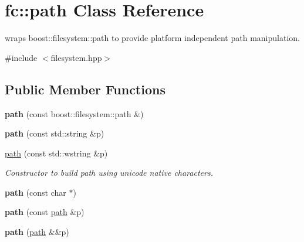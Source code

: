 \hypertarget{classfc_1_1path}{}\section{fc\+:\+:path Class Reference}
\label{classfc_1_1path}


wraps boost\+::filesystem\+::path to provide platform independent path manipulation.  




{\ttfamily \#include $<$filesystem.\+hpp$>$}

\subsection*{Public Member Functions}
\begin{DoxyCompactItemize}
\item 
\mbox{\label{classfc_1_1path_add8f88ad5dd493b16904860ce9be6493}} 
{\bfseries path} (const boost\+::filesystem\+::path \&)
\item 
\mbox{\label{classfc_1_1path_aca67292cff9d14da2d8814d09e0a7193}} 
{\bfseries path} (const std\+::string \&p)
\item 
\mbox{\label{classfc_1_1path_a53f157da299530b9241885abc9aed113}} 
\mbox{\hyperlink{classfc_1_1path_a53f157da299530b9241885abc9aed113}{path}} (const std\+::wstring \&p)
\begin{DoxyCompactList}\small\item\em Constructor to build path using unicode native characters. \end{DoxyCompactList}\item 
\mbox{\label{classfc_1_1path_ab7e23e521ace1a15d0958d16e43cb69f}} 
{\bfseries path} (const char $\ast$)
\item 
\mbox{\label{classfc_1_1path_a29e0e41c28ed846b7c9dca9b3031a4da}} 
{\bfseries path} (const \mbox{\hyperlink{classfc_1_1path}{path}} \&p)
\item 
\mbox{\label{classfc_1_1path_ab7ad3a6bc6a10744488f4fd18c163f16}} 
{\bfseries path} (\mbox{\hyperlink{classfc_1_1path}{path}} \&\&p)
\item 
\mbox{\label{classfc_1_1path_a76df00a037a781a2ebb3ae3100e06929}} 

\end{DoxyCompactItemize}
